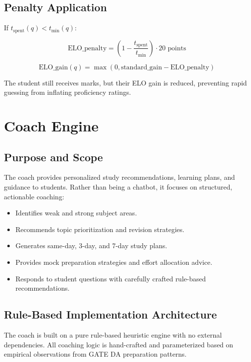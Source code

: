 \documentclass[sigconf,authordraft,twoside]{acmart}
\begin{document}
\subsection{Penalty Application}

If $t_{\text{spent}}(q) < t_{\text{min}}(q)$:

\begin{equation}
\text{ELO\_penalty} = (1 - \frac{t_{\text{spent}}}{t_{\text{min}}}) \cdot 20 \text{ points}
\end{equation}

\begin{equation}
\text{ELO\_gain}(q) = \max(0, \text{standard\_gain} - \text{ELO\_penalty})
\end{equation}

The student still receives marks, but their ELO gain is reduced, preventing rapid guessing from inflating proficiency ratings.

\section{Coach Engine}

\subsection{Purpose and Scope}
The coach provides personalized study recommendations, learning plans, and guidance to students. Rather than being a chatbot, it focuses on structured, actionable coaching:

\begin{itemize}
\item Identifies weak and strong subject areas.
\item Recommends topic prioritization and revision strategies.
\item Generates same-day, 3-day, and 7-day study plans.
\item Provides mock preparation strategies and effort allocation advice.
\item Responds to student questions with carefully crafted rule-based recommendations.
\end{itemize}

\subsection{Rule-Based Implementation Architecture}

The coach is built on a pure rule-based heuristic engine with no external dependencies. All coaching logic is hand-crafted and parameterized based on empirical observations from GATE DA preparation patterns.
\end{document}

